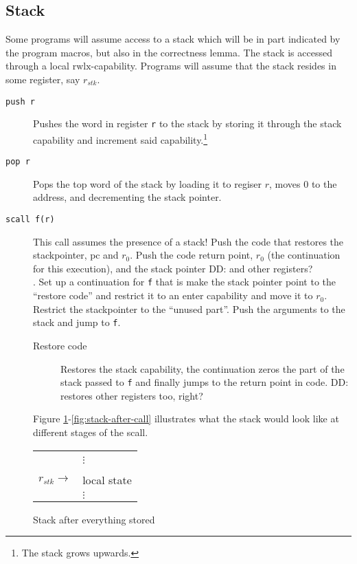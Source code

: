 \documentclass[a4paper]{article}
\newcommand\dominique[1]{{\color{purple} \sf \footnotesize {DD: #1}}\\}
\newcommand{\var}[1]{\mathit{#1}}
\newcommand{\pcreg}{\mathrm{pc}}
\newcommand{\plainperm}[1]{\mathrm{#1}}
\newcommand{\rwlx}{\plainperm{rwlx}}
\begin{document}
\subsection{Stack}
Some programs will assume access to a stack which will be in part indicated by the program macros, but also in the correctness lemma. The stack is accessed through a local $\rwlx$-capability. Programs will assume that the stack resides in some register, say $r_{\var{stk}}$.
\begin{description}
\item[\texttt{push r}] Pushes the word in register \texttt{r} to the stack by storing it through the stack capability and increment said capability.\footnote{The stack grows upwards.}
\item[\texttt{pop r}] Pops the top word of the stack by loading it to regiser $r$, moves 0 to the address, and decrementing the stack pointer.
\item[\texttt{scall f(r)}] This call assumes the presence of a stack! Push the code that restores the stackpointer, $\pcreg$ and $r_0$. Push the code return point, $r_0$ (the continuation for this execution), and the stack pointer \dominique{and other registers?}. Set up a continuation for \texttt{f} that is make the stack pointer point to the ``restore code'' and restrict it to an enter capability and move it to $r_0$. Restrict the stackpointer to the ``unused part''. Push the arguments to the stack and jump to \texttt{f}.
  \begin{description}
  \item[Restore code] Restores the stack capability, the continuation zeros the part of the stack passed to \texttt{f} and finally jumps to the return point in code. \dominique{restores other registers too, right?}
  \end{description}
Figure \ref{fig:stack-before-call}-\ref{fig:stack-after-call} illustrates what the stack would look like at different stages of the scall.
\end{description}

\begin{figure}
  \label{fig:stack-before-call}
  \centering
  \begin{tabular}[!h]{r | >{\centering\arraybackslash}p{3cm} |}
   & \\
   & $\vdots$\\
\cline{2-2}
   & 0 \\
\cline{2-2}
$r_{\var{stk}} \rightarrow$   & local state\\
   & $\vdots$
\end{tabular}
\caption{Stack after everything stored}
\end{figure}
\end{document}
